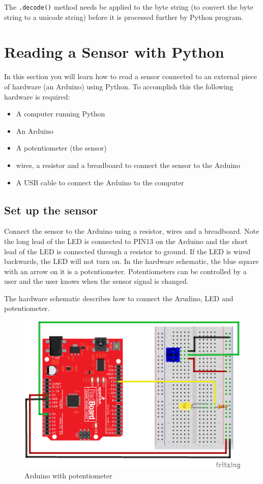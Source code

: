 \documentclass{book}
\makeatletter
\def\maxwidth{\ifdim\Gin@nat@width>\linewidth\linewidth
    \else\Gin@nat@width\fi}
\let\Oldincludegraphics\includegraphics
\renewcommand{\includegraphics}[1]{\Oldincludegraphics[width=.8\maxwidth]{#1}}
\providecommand{\tightlist}{%
      \setlength{\itemsep}{0pt}\setlength{\parskip}{0pt}}
\makeatother
\begin{document}
The \lstinline!.decode()! method needs be applied to the byte string (to
convert the byte string to a unicode string) before it is processed
further by Python program.

    \section{Reading a Sensor with
Python}\label{reading-a-sensor-with-python}

    In this section you will learn how to read a sensor connected to an
external piece of hardware (an Arduino) using Python. To accomplish this
the following hardware is required:

\begin{itemize}
\tightlist
\item
  A computer running Python
\item
  An Arduino
\item
  A potentiometer (the sensor)
\item
  wires, a resistor and a breadboard to connect the sensor to the
  Arduino
\item
  A USB cable to connect the Arduino to the computer
\end{itemize}

    \subsection{Set up the sensor}\label{set-up-the-sensor}

    Connect the sensor to the Arduino using a resistor, wires and a
breadboard. Note the long lead of the LED is connected to PIN13 on the
Arduino and the short lead of the LED is connected through a resistor to
ground. If the LED is wired backwards, the LED will not turn on. In the
hardware schematic, the blue square with an arrow on it is a
potentiometer. Potentiometers can be controlled by a user and the user
knows when the sensor signal is changed.

The hardware schematic describes how to connect the Arudino, LED and
potentiometer.

    \begin{figure}
\centering
\includegraphics{images/redboard_pot_led_fritzing.png}
\caption{Arduino with potentiometer}
\end{figure}
\end{document}
